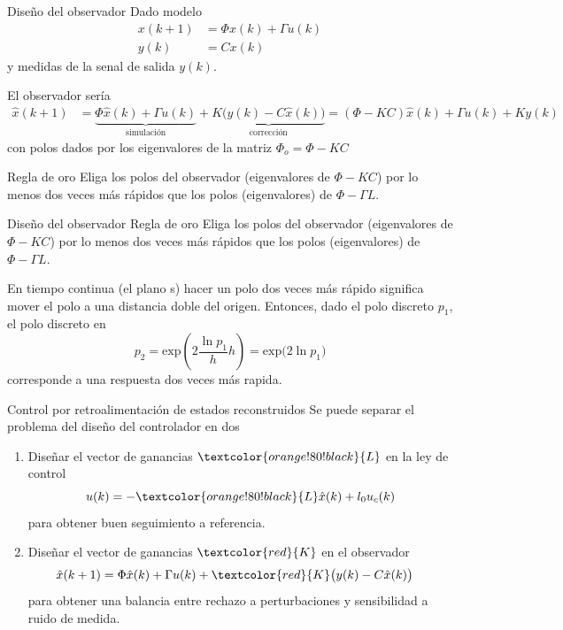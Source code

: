 \documentclass[presentation,aspectratio=1610]{beamer}
\begin{document}
\begin{frame}[label={sec:orge540cb4}]{Diseño del observador}
Dado modelo
 \begin{equation*}
 \begin{split}
  x(k+1) &= \Phi x(k) + \Gamma u(k)\\
  y(k) &= C x(k)
 \end{split}
 \label{eq:ssmodel}
\end{equation*}
y medidas de la senal de salida \(y(k)\). 

El observador sería 
\begin{equation*}
\begin{split}
\hat{x}(k+1) &= \underbrace{\Phi \hat{x}(k) + \Gamma u(k)}_{\text{simulación}} + \underbrace{K\big(y(k) - C\hat{x}(k)\big)}_{\text{corrección}} = \left(\Phi - KC\right)\hat{x}(k) +  \Gamma u(k) + Ky(k)
\end{split}
\end{equation*}
con polos dados por los eigenvalores de la matriz \(\Phi_o = \Phi - KC\)

\alert{Regla de oro} Eliga los polos del observador (eigenvalores de \(\Phi-KC\)) por lo menos dos veces más rápidos que los polos (eigenvalores) de \(\Phi-\Gamma L\).
\end{frame}

\begin{frame}[label={sec:org9316cbd}]{Diseño del observador}
\alert{Regla de oro} Eliga los polos del observador (eigenvalores de \(\Phi-KC\)) por lo menos dos veces más rápidos que los polos (eigenvalores) de \(\Phi-\Gamma L\).

En tiempo continua (el plano s) hacer un polo dos veces más rápido significa mover el polo a una distancia doble del origen. Entonces, dado el polo discreto \(p_1\), el polo discreto en 
\[ p_2 = \text{exp}\left( 2 \frac{\ln p_1}{h} h\right) = \text{exp} \big( 2 \ln p_1 \big)\]
corresponde a una respuesta dos veces más rapida.
\end{frame}

\begin{frame}[label={sec:org8eff4f7}]{Control por retroalimentación de estados reconstruidos}
Se puede separar el problema del diseño del controlador en dos
\begin{enumerate}
\item Diseñar el vector de ganancias \(\textcolor{orange!80!black}{L}\) en la ley de control
\[ u(k) = -\textcolor{orange!80!black}{L} \hat{x}(k) + l_0 u_c(k)\]
para obtener buen seguimiento a referencia.
\item Diseñar el vector de ganancias \(\textcolor{red}{K}\) en el observador 
\begin{equation*}
\begin{split}
\hat{x}(k+1) &= \Phi \hat{x}(k) + \Gamma u(k) + \textcolor{red}{K} \big(y(k) - C\hat{x}(k)\big)
\end{split}
\end{equation*}
para obtener una balancia entre rechazo a perturbaciones y sensibilidad a ruido de medida.
\end{enumerate}
\end{frame}
\end{document}
